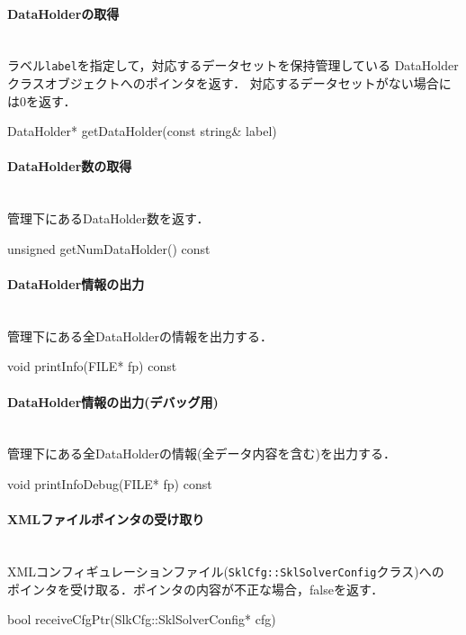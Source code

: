 \paragraph{DataHolderの取得}\mbox{}\\
ラベル{\tt label}を指定して，対応するデータセットを保持管理している
DataHolderクラスオブジェクトへのポインタを返す．
対応するデータセットがない場合には0を返す．
{\small
\begin{program}
DataHolder* getDataHolder(const string& label)
\end{program}
}

\paragraph{DataHolder数の取得}\mbox{}\\
管理下にあるDataHolder数を返す．
{\small
\begin{program}
unsigned getNumDataHolder() const
\end{program}
}

\paragraph{DataHolder情報の出力}\mbox{}\\
管理下にある全DataHolderの情報を出力する．
{\small
\begin{program}
void printInfo(FILE* fp) const
\end{program}
}

\paragraph{DataHolder情報の出力(デバッグ用)}\mbox{}\\
管理下にある全DataHolderの情報(全データ内容を含む)を出力する．
{\small
\begin{program}
void printInfoDebug(FILE* fp) const
\end{program}
}

\paragraph{XMLファイルポインタの受け取り}\mbox{}\\
XMLコンフィギュレーションファイル({\tt SklCfg::SklSolverConfig}クラス)への
ポインタを受け取る．ポインタの内容が不正な場合，falseを返す．
{\small
\begin{program}
bool receiveCfgPtr(SlkCfg::SklSolverConfig* cfg)
\end{program}
}

